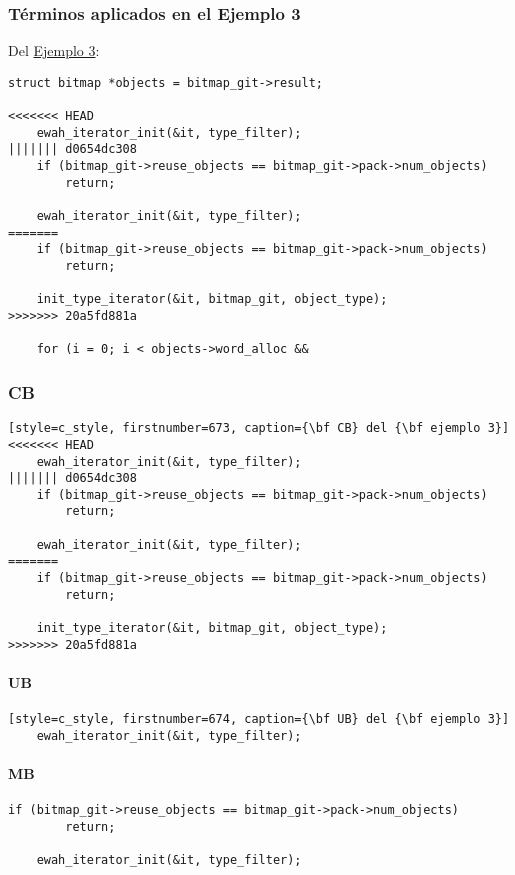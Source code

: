 \subsubsection{Términos aplicados en el Ejemplo 3}

Del \hyperref[example_03]{Ejemplo 3}:
\begin{lstlisting}[style=c_style, firstnumber=671, caption=Conflicto del {\bf ejemplo 3}]
	struct bitmap *objects = bitmap_git->result;

<<<<<<< HEAD
	ewah_iterator_init(&it, type_filter);
||||||| d0654dc308
	if (bitmap_git->reuse_objects == bitmap_git->pack->num_objects)
		return;

	ewah_iterator_init(&it, type_filter);
=======
	if (bitmap_git->reuse_objects == bitmap_git->pack->num_objects)
		return;

	init_type_iterator(&it, bitmap_git, object_type);
>>>>>>> 20a5fd881a

	for (i = 0; i < objects->word_alloc &&
\end{lstlisting}

\subsubsection*{CB}
\begin{lstlisting}[style=c_style, firstnumber=673, caption={\bf CB} del {\bf ejemplo 3}]
<<<<<<< HEAD
	ewah_iterator_init(&it, type_filter);
||||||| d0654dc308
	if (bitmap_git->reuse_objects == bitmap_git->pack->num_objects)
		return;

	ewah_iterator_init(&it, type_filter);
=======
	if (bitmap_git->reuse_objects == bitmap_git->pack->num_objects)
		return;

	init_type_iterator(&it, bitmap_git, object_type);
>>>>>>> 20a5fd881a
\end{lstlisting}

\paragraph{UB}
\begin{lstlisting}[style=c_style, firstnumber=674, caption={\bf UB} del {\bf ejemplo 3}]
	ewah_iterator_init(&it, type_filter);
\end{lstlisting}

\paragraph{MB}
\begin{lstlisting}[style=c_style, firstnumber=676, caption=One {\bf MB} del {\bf ejemplo 3}]
	if (bitmap_git->reuse_objects == bitmap_git->pack->num_objects)
		return;

	ewah_iterator_init(&it, type_filter);
\end{lstlisting}

